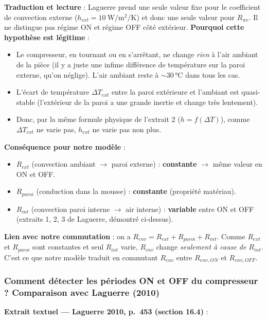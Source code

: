 \documentclass[11pt,a4paper]{article}
\begin{document}
\textbf{Traduction et lecture} : Laguerre prend une seule valeur fixe pour le coefficient
de convection externe ($h_{ext} = \SI{10}{\watt\per\meter\squared\per\kelvin}$) et donc une
seule valeur pour $R_{we}$. Il ne distingue pas régime ON et régime OFF côté extérieur.
\textbf{Pourquoi cette hypothèse est légitime} :
\begin{itemize}[itemsep=2pt]
\item Le compresseur, en tournant ou en s'arrêtant, ne change \emph{rien} à l'air ambiant
de la pièce (il y a juste une infime différence de température sur la paroi externe, qu'on
néglige). L'air ambiant reste à $\sim 30\,\si{\celsius}$ dans tous les cas.
\item L'écart de température $\Delta T_{ext}$ entre la paroi extérieure et l'ambiant est
quasi-stable (l'extérieur de la paroi a une grande inertie et change très lentement).
\item Donc, par la même formule physique de l'extrait 2 ($h = f(\Delta T)$), comme
$\Delta T_{ext}$ ne varie pas, $h_{ext}$ ne varie pas non plus.
\end{itemize}

\textbf{Conséquence pour notre modèle} :
\begin{itemize}[itemsep=2pt]
\item $R_{ext}$ (convection ambiant $\to$ paroi externe) : \textbf{constante} $\to$
même valeur en ON et OFF.
\item $R_{paroi}$ (conduction dans la mousse) : \textbf{constante} (propriété matériau).
\item $R_{int}$ (convection paroi interne $\to$ air interne) : \textbf{variable} entre ON
et OFF (extraits 1, 2, 3 de Laguerre, démontré ci-dessus).
\end{itemize}

\textbf{Lien avec notre commutation} : on a $R_{env} = R_{ext} + R_{paroi} + R_{int}$.
Comme $R_{ext}$ et $R_{paroi}$ sont constantes et seul $R_{int}$ varie, $R_{env}$ change
\emph{seulement à cause de $R_{int}$}. C'est ce que notre modèle traduit en commutant
$R_{env}$ entre $R_{env,ON}$ et $R_{env,OFF}$.

\subsubsection*{Comment détecter les périodes ON et OFF du compresseur ? Comparaison avec Laguerre (2010)}

\textbf{Extrait textuel — Laguerre 2010, p.~453 (section 16.4)} :
\end{document}
